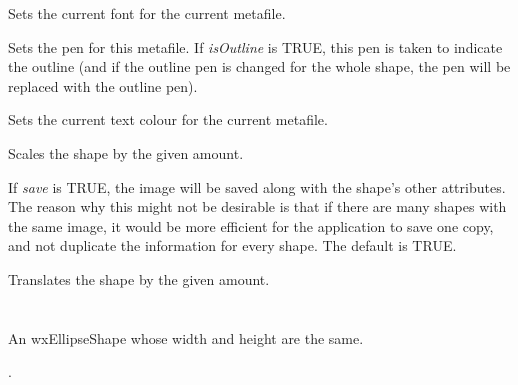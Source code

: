 
Sets the current font for the current metafile.

\label{wxdrawnshapesetdrawnpen}


Sets the pen for this metafile. If {\it isOutline} is TRUE, this pen is taken to indicate the outline
(and if the outline pen is changed for the whole shape, the pen will be replaced with the outline pen).

\label{wxdrawnshapesetdrawntextcolour}


Sets the current text colour for the current metafile.



Scales the shape by the given amount.



If {\it save} is TRUE, the image will be saved along with the shape's other attributes. The reason
why this might not be desirable is that if there are many shapes with the same image, it would be
more efficient for the application to save one copy, and not duplicate the information for every
shape. The default is TRUE.



Translates the shape by the given amount.

\section{}\label{wxcircleshape}

An wxEllipseShape whose width and height are the same.


.


